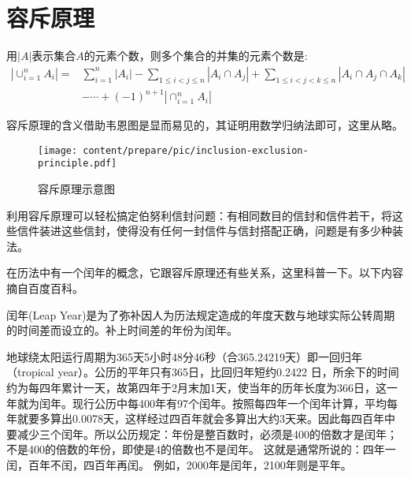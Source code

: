
\section{容斥原理}
\label{sec:inclusion-exclusion-principle}

\begin{principle}[容斥原理]
  用$|A|$表示集合$A$的元素个数，则多个集合的并集的元素个数是:
  \begin{equation}
    \label{eq:inclusion-exclusion-principle}
    \begin{split}
    |\cup_{i=1}^nA_i|= & \sum_{i=1}^n|A_i|-\sum_{1\leqslant i <j \leqslant n}|A_i \cap A_j|+\sum_{1 \leqslant i <j <k \leqslant n}|A_i\cap A_j \cap A_k| \\
 & -\cdots+(-1)^{n+1}|\cap_{i=1}^nA_i|
    \end{split}
  \end{equation}
\end{principle}
容斥原理的含义借助韦恩图是显而易见的，其证明用数学归纳法即可，这里从略。

\begin{figure}[htbp]
  \centering
\texttt{[image: content/prepare/pic/inclusion-exclusion-principle.pdf]}
\caption{容斥原理示意图}
\label{fig:inclusion-exclusion-principle}
\end{figure}


利用容斥原理可以轻松搞定伯努利信封问题：有相同数目的信封和信件若干，将这些信件装进这些信封，使得没有任何一封信件与信封搭配正确，问题是有多少种装法。

在历法中有一个闰年的概念，它跟容斥原理还有些关系，这里科普一下。以下内容摘自百度百科。

闰年(Leap Year)是为了弥补因人为历法规定造成的年度天数与地球实际公转周期的时间差而设立的。补上时间差的年份为闰年。

地球绕太阳运行周期为365天5小时48分46秒（合365.24219天）即一回归年（tropical year）。公历的平年只有365日，比回归年短约0.2422 日，所余下的时间约为每四年累计一天，故第四年于2月末加1天，使当年的历年长度为366日，这一年就为闰年。现行公历中每400年有97个闰年。按照每四年一个闰年计算，平均每年就要多算出0.0078天，这样经过四百年就会多算出大约3天来。因此每四百年中要减少三个闰年。所以公历规定：年份是整百数时，必须是400的倍数才是闰年；不是400的倍数的年份，即使是4的倍数也不是闰年。
这就是通常所说的：四年一闰，百年不闰，四百年再闰。 例如，2000年是闰年，2100年则是平年。

